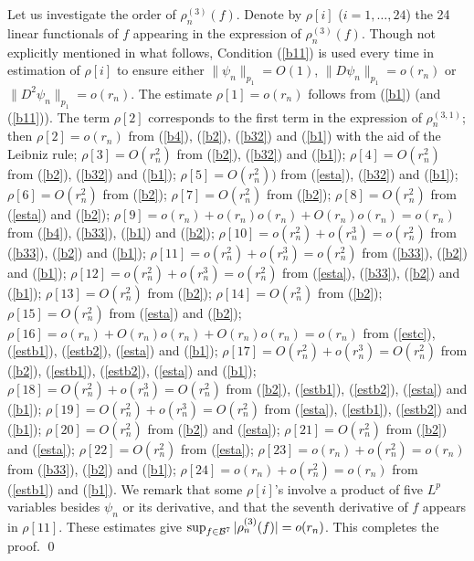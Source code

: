 \documentclass[a4paper]{article}
\numberwithin{equation}{section}
\begin{document}
{{Let us investigate the order of $\rho^{(3)}_n(f)$. 
Denote by $\rho[i]$ ($i=1,\dots,24$) 
the 24 linear functionals of $f$ appearing in the expression of $\rho^{(3)}_n(f)$.  
Though not explicitly mentioned in what follows, 
Condition (\ref{b11}) is used every time in estimation of $\rho[i]$ to ensure either 
$\|\psi_n\|_{p_1}=O(1)$, $\|D\psi_n\|_{p_1}=o(r_n)$ or $\|D^2\psi_n\|_{p_1}=o(r_n)$. 
The estimate $\rho[1]=o(r_n)$ follows from (\ref{b1}) (and (\ref{b11})).
{\color {black} The term $\rho[2]$  corresponds to the first term in the expression of $\rho^{(3,1)}_n$; then}
$\rho[2]=o(r_n)$ from (\ref{b4}), (\ref{b2}), (\ref{b32}) and (\ref{b1}) with the aid of the Leibniz rule; 
$\rho[3]=O(r_n^2)$ from (\ref{b2}), (\ref{b32}) and (\ref{b1}); 
$\rho[4]=O(r_n^2)$ from (\ref{b2}), (\ref{b32}) and (\ref{b1}); 
$\rho[5]=O(r_n^2))$ from (\ref{esta}), (\ref{b32}) and (\ref{b1}); 
$\rho[6]=O(r_n^2)$ from (\ref{b2}); 
$\rho[7]=O(r_n^2)$ from (\ref{b2}); 
$\rho[8]=O(r_n^2)$ from (\ref{esta}) and (\ref{b2}); 
$\rho[9]=o(r_n)+o(r_n)o(r_n)+O(r_n)o(r_n)=o(r_n)$ from (\ref{b4}), (\ref{b33}), (\ref{b1}) and (\ref{b2}); 
$\rho[10]=o(r_n^2)+o(r_n^3)=o(r_n^2)$ from (\ref{b33}), (\ref{b2}) and (\ref{b1}); 
$\rho[11]=o(r_n^2)+o(r_n^3)=o(r_n^2)$ from (\ref{b33}), (\ref{b2}) and (\ref{b1}); 
$\rho[12]=o(r_n^2)+o(r_n^3)=o(r_n^2)$ from (\ref{esta}), (\ref{b33}), (\ref{b2}) and (\ref{b1}); 
$\rho[13]=O(r_n^2)$ from (\ref{b2}); 
$\rho[14]=O(r_n^2)$ from (\ref{b2}); 
$\rho[15]=O(r_n^2)$ from (\ref{esta}) and (\ref{b2}); 
$\rho[16]=o(r_n)+O(r_n)o(r_n)+O(r_n)o(r_n)=o(r_n)$ from (\ref{estc}), (\ref{estb1}), (\ref{estb2}), (\ref{esta}) and (\ref{b1}); 
$\rho[17]=O(r_n^2)+o(r_n^3)=O(r_n^2)$ from (\ref{b2}), (\ref{estb1}), (\ref{estb2}), (\ref{esta}) and (\ref{b1}); 
$\rho[18]=O(r_n^2)+o(r_n^3)=O(r_n^2)$ from (\ref{b2}), (\ref{estb1}), (\ref{estb2}), (\ref{esta}) and (\ref{b1}); 
$\rho[19]=O(r_n^2)+o(r_n^3)=O(r_n^2)$ from (\ref{esta}), (\ref{estb1}), (\ref{estb2}) and (\ref{b1}); 
$\rho[20]=O(r_n^2)$ from (\ref{b2}) and (\ref{esta}); 
$\rho[21]=O(r_n^2)$ from (\ref{b2}) and (\ref{esta}); 
$\rho[22]=O(r_n^2)$ from (\ref{esta}); 
$\rho[23]=o(r_n)+o(r_n^2)=o(r_n)$ from (\ref{b33}), (\ref{b2}) and (\ref{b1}); 
$\rho[24]=o(r_n)+o(r_n^2)=o(r_n)$ from (\ref{estb1}) and (\ref{b1}). 
We remark that some $\rho[i]$'s involve a product of five $L^p$ variables besides $\psi_n$ or its derivative, 
and that the seventh derivative of $f$ appears in $\rho[11]$. 
These estimates give $\sup_{f\in{\mathcal B}^7}|\rho^{(3)}_n(f)|=o(r_n)$. 
This completes the proof. 
}
\qed
\vspace*{5mm}


}
\end{document}
